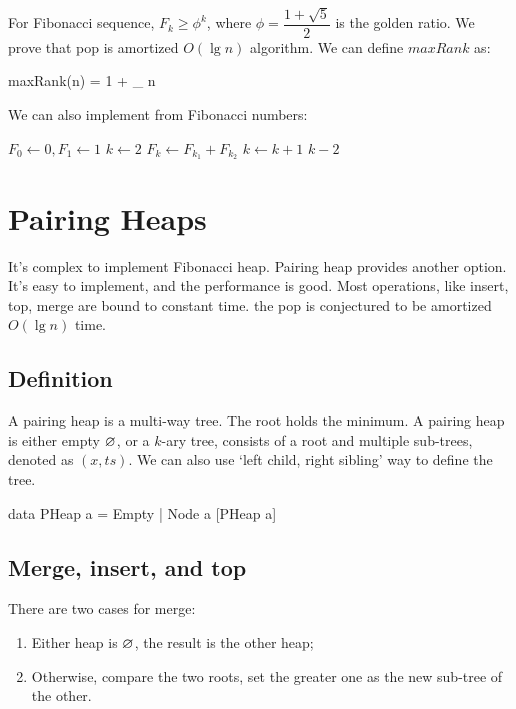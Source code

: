 \documentclass[b5paper]{article}
\begin{document}
For Fibonacci sequence, $F_k \geq \phi^k$, where $\phi = \dfrac{1+\sqrt{5}}{2}$ is the golden ratio. We prove that pop is amortized $O(\lg n)$ algorithm. We can define $maxRank$ as:

\be
  maxRank(n) = 1 + \lfloor \log_{\phi} n \rfloor
\ee

We can also implement  from Fibonacci numbers:

\begin{algorithmic}[1]
  \State $F_0 \gets 0, F_1 \gets 1$
  \State $k \gets 2$
  \Repeat
    \State $F_k \gets F_{k_1} + F_{k_2}$
    \State $k \gets k + 1$
  \State \Return $k - 2$
\EndFunction
\end{algorithmic}

\section{Pairing Heaps}
\label{pairing-heap} 

It's complex to implement Fibonacci heap. Pairing heap provides another option. It's easy to implement, and the performance is good. Most operations, like insert, top, merge are bound to constant time. the pop is conjectured to be amortized $O(\lg n)$ time\cite{pairing-heap}\cite{okasaki-book}.

\subsection{Definition}

A pairing heap is a multi-way tree. The root holds the minimum. A pairing heap is either empty $\varnothing$, or a $k$-ary tree, consists of a root and multiple sub-trees, denoted as $(x, ts)$. We can also use `left child, right sibling' way to define the tree.

\begin{Haskell}
data PHeap a = Empty | Node a [PHeap a]
\end{Haskell}

\subsection{Merge, insert, and top}
 

There are two cases for merge:

\begin{enumerate}
\item Either heap is $\varnothing$, the result is the other heap;
\item Otherwise, compare the two roots, set the greater one as the new sub-tree of the other.
\end{enumerate}
\end{document}
